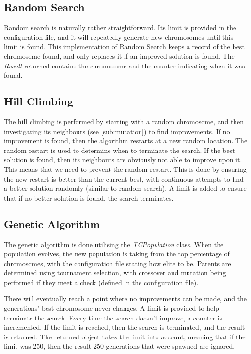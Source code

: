 \documentclass[11pt, a4paper]{article}
\begin{document}
\subsection{Random Search}
\label{sub:random_search}
Random search is naturally rather straightforward. Its limit is provided in the
configuration file, and it will repeatedly generate new chromosomes until this
limit is found. This implementation of Random Search keeps a record of the best
chromosome found, and only replaces it if an improved solution is found. The
\emph{Result} returned contains the chromosome and the counter indicating when
it was found.

\subsection{Hill Climbing}
\label{sub:hill_climbing}
The hill climbing is performed by starting with a random chromosome, and then
investigating its neighbours (see \ref{sub:mutation}) to find improvements. If
no improvement is found, then the algorithm restarts at a new random location.
The random restart is used to determine when to terminate the search. If the
best solution is found, then its neighbours are obviously not able to improve
upon it. This means that we need to prevent the random restart. This is done by
ensuring the new restart is better than the current best, with continuous
attempts to find a better solution randomly (similar to random search). A limit
is added to ensure that if no better solution is found, the search terminates.

\subsection{Genetic Algorithm}
\label{sub:genetic_algorithm}
The genetic algorithm is done utilising the \emph{TCPopulation} class. When the
population evolves, the new population is taking from the top percentage of
chromosomes, with the configuration file stating how elite to be. Parents are
determined using tournament selection, with crossover and mutation being
performed if they meet a check (defined in the configuration file).

There will eventually reach a point where no improvements can be made, and the
generations' best chromosome never changes. A limit is provided to help
terminate the search. Every time the search doesn't improve, a counter is
incremented. If the limit is reached, then the search is terminated, and the
result is returned. The returned object takes the limit into account, meaning
that if the limit was 250, then the result 250 generations that were spawned are
ignored.
\end{document}
